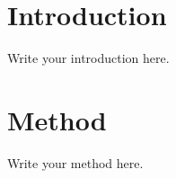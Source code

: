 

\sloppy  %

\frontmatter
\maketitle
\tableofcontents

\mainmatter  %

% 
% 


\chapter{Introduction}
Write your introduction here.

\chapter{Method}
Write your method here.





